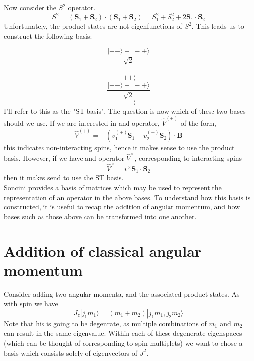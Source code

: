 \documentclass[12pt]{article}
\begin{document}
\noindent Now consider the $S^{2}$ operator. 
\begin{equation}
S^{2} = (\mathbf{S}_{1}+\mathbf{S}_{2})\cdot (\mathbf{S}_{1}+\mathbf{S}_{2})= 
S^{2}_{1}+S^{2}_{2} + 2\mathbf{S}_{1}\cdot \mathbf{S}_{2}
\end{equation}
\noindent Unfortunately, the product states are not eigenfunctions of $S^{2}$.
This leads us to construct the following basis:

\begin{equation*}
\frac{|+-\rangle - | -+ \rangle}{\sqrt{2}}
\end{equation*}
\\
\begin{equation*}
|++\rangle
\end{equation*}
\begin{equation*}
\frac{|+-\rangle - | -+ \rangle}{\sqrt{2}}
\end{equation*}
\begin{equation*}
|--\rangle
\end{equation*}
\noindent I'll refer to this as the "ST basis". The question is now which of
these two bases should we use. If we are interested in and operator,
$\hat{V}^{(+)}$ of the form,
\begin{equation}
\hat{V}^{(+)} = -(v^{(+)}_{1}\mathbf{S}_{1} + v^{(+)}_{2}\mathbf{S}_{2}) \cdot \mathbf{B}
\end{equation}
this indicates non-interacting spins, hence it makes sense to use the product
basis.  However, if we have and operator $\hat{V}^{\times}$, corresponding to 
interacting spins
\begin{equation}
\hat{V}^{\times} = v^{\times}\mathbf{S}_{1}\cdot\mathbf{S}_{2}
\end{equation}
then it makes send to use the ST basis.\\

\noindent Soncini provides a basis of matrices which may be used to represent
the representation of an operator in the above bases. To understand how this
basis is constructed, it is useful to recap the addition of angular momentum,
and how bases such as those above can be transformed into one another. 

\section{Addition of classical angular momentum}
Consider adding two angular momenta, and the associated product states. As
with spin we have
\begin{equation}
J_{z}|j_{1}m_{1} \rangle = (m_{1}+m_{2})|j_{1}m_{1}, j_{2}m_{2} \rangle
\end{equation}
Note that his is going to be degenrate, as multiple combinations of $m_{1}$ and
$m_{2}$ can result in the same eigenvalue. Within each of these degenerate
eigenspaces (which can be thought of corresponding to spin multiplets) we want
to chose a basis which consists solely of eigenvectors of $J^{2}$.\\
\end{document}
